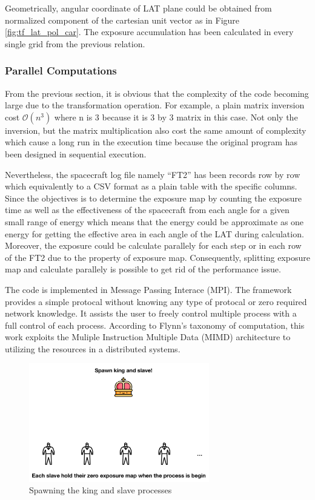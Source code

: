 Geometrically, angular coordinate of LAT plane could be obtained from
normalized component of the cartesian unit vector as in Figure
\ref{fig:tf_lat_pol_car}. The exposure accumulation has been
calculated in every single grid from the previous relation.

\subsubsection{Parallel Computations}

From the previous section, it is obvious that the complexity of 
the code becoming large due to the transformation operation.
For example, a plain matrix inversion cost $\mathcal{O}(n^3)$ where 
n is 3 because it is 3 by 3 matrix in this case. Not only the inversion,
but the matrix multiplication also cost the same amount of
complexity which cause a long run in the execution time because 
the original program has been designed in sequential execution.

Nevertheless, the spacecraft log file namely ``FT2'' has been records
row by row which equivalently to a CSV format as a plain table with 
the specific columns. Since the objectives is to determine the exposure map
by counting the exposure time as well as the effectiveness of the spacecraft 
from each angle for a given small range of energy which means that 
the energy could be approximate as one energy for getting the effective 
area in each angle of the LAT during calculation. Moreover, the exposure 
could be calculate parallely for each step or in each row of the FT2 due to 
the property of exposure map. Consequently, splitting exposure map 
and calculate parallely is possible to get rid of the performance issue.

The code is implemented
in Message Passing Interace (MPI). The framework provides 
a simple protocal without knowing any type of protocal or 
zero required network knowledge. It assists the user to 
freely control multiple process with a full control of 
each process. According to Flynn's taxonomy of computation,
this work exploits the Muliple Instruction Multiple Data (MIMD)
architecture to utilizing the resources in a distributed systems.

\begin{figure}[h]
    \centering
    \includegraphics[width=0.7\textwidth]{content/methodology/figures/ms1}
    \caption{Spawning the king and slave processes}
    \label{fig:ms1}
\end{figure}

